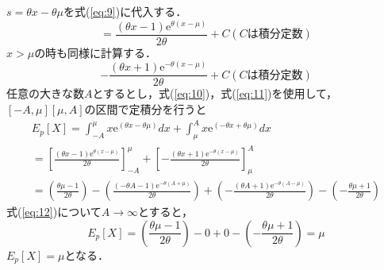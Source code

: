 \documentclass[uplatex,b5j]{jsarticle} %
\begin{document}
$s=\theta x -\theta \mu$を式(\ref{eq:9})に代入する．
\begin{equation}
    =\frac{(\theta x-1)\mathrm{e}^{\theta(x-\mu)}}{2\theta} + C (Cは積分定数) \label{eq:10}
\end{equation}
$x>\mu$の時も同様に計算する．
\begin{equation}
    -\frac{(\theta x+1)\mathrm{e}^{-\theta(x-\mu)}}{2\theta} + C (Cは積分定数) \label{eq:11}
\end{equation}
任意の大きな数$A$とするとし，式(\ref{eq:10})，式(\ref{eq:11})を使用して，$[-A,\mu][\mu,A]$の区間で定積分を行うと
\begin{eqnarray} \label{eq:12}
    E_p[X]=\int_{-A}^{\mu}x\mathrm{e}^{(\theta x -\theta \mu)} dx + \int_{\mu}^{A}x\mathrm{e}^{(-\theta x +\theta \mu)} dx \\ \nonumber
    =\left[\frac{(\theta x-1)\mathrm{e}^{\theta(x-\mu)}}{2\theta}\right]_{-A}^{\mu} + \left[-\frac{(\theta x+1)\mathrm{e}^{-\theta(x-\mu)}}{2\theta}\right]_{\mu}^{A} \\ \nonumber
    = \left(\frac{\theta \mu-1}{2\theta}\right) - \left(\frac{(-\theta A-1)\mathrm{e}^{-\theta(A+\mu)}}{2\theta}\right) + \left(-\frac{(\theta A+1)\mathrm{e}^{-\theta(A-\mu)}}{2\theta}\right) - \left(-\frac{\theta \mu+1}{2\theta}\right)
\end{eqnarray}
式(\ref{eq:12})について$A \to \infty$とすると，
\begin{equation}
    E_p[X] = \left(\frac{\theta \mu-1}{2\theta}\right) - 0 + 0 - \left(-\frac{\theta \mu+1}{2\theta}\right)
    = \mu
\end{equation}
$E_p[X] = \mu$となる．
\end{document}
